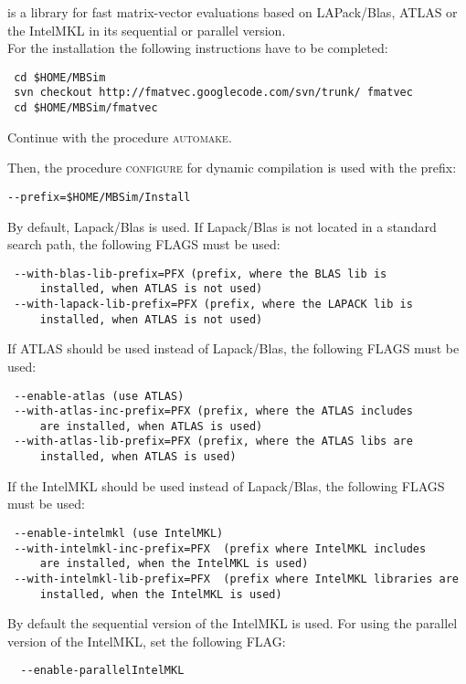 \subsubsection{\FMatVec{}}
\FMatVec{} is a library for fast matrix-vector evaluations based on LAPack/Blas, ATLAS or the IntelMKL in its sequential or parallel version.\\
For the installation the following instructions have to be completed:
\begin{verbatim}
 cd $HOME/MBSim
 svn checkout http://fmatvec.googlecode.com/svn/trunk/ fmatvec
 cd $HOME/MBSim/fmatvec
\end{verbatim}
Continue with the procedure \textsc{automake}.\par
Then, the procedure \textsc{configure} for dynamic compilation is used with the prefix:
\begin{verbatim}
--prefix=$HOME/MBSim/Install
\end{verbatim}

By default, Lapack/Blas is used. If Lapack/Blas is not located in a standard search path, the following FLAGS must be used:
\begin{verbatim}
 --with-blas-lib-prefix=PFX (prefix, where the BLAS lib is
     installed, when ATLAS is not used)
 --with-lapack-lib-prefix=PFX (prefix, where the LAPACK lib is
     installed, when ATLAS is not used)
\end{verbatim}

If ATLAS should be used instead of Lapack/Blas, the following FLAGS must be used:
\begin{verbatim}
 --enable-atlas (use ATLAS)
 --with-atlas-inc-prefix=PFX (prefix, where the ATLAS includes 
     are installed, when ATLAS is used)
 --with-atlas-lib-prefix=PFX (prefix, where the ATLAS libs are
     installed, when ATLAS is used)
\end{verbatim}

If the IntelMKL should be used instead of Lapack/Blas, the following FLAGS must be used:
\begin{verbatim}
 --enable-intelmkl (use IntelMKL)
 --with-intelmkl-inc-prefix=PFX  (prefix where IntelMKL includes
     are installed, when the IntelMKL is used)
 --with-intelmkl-lib-prefix=PFX  (prefix where IntelMKL libraries are
     installed, when the IntelMKL is used)
\end{verbatim}

By default the sequential version of the IntelMKL is used. For using the parallel version of the IntelMKL, set the following FLAG:
\begin{verbatim}
  --enable-parallelIntelMKL
\end{verbatim}

